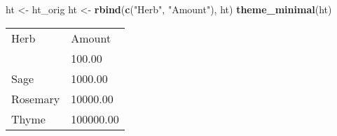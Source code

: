 \documentclass[]{article}
\newenvironment{Shaded}{\begin{snugshade}}{\end{snugshade}}
\newcommand{\KeywordTok}[1]{\textcolor[rgb]{0.13,0.29,0.53}{\textbf{{#1}}}}
\newcommand{\StringTok}[1]{\textcolor[rgb]{0.31,0.60,0.02}{{#1}}}
\newcommand{\NormalTok}[1]{{#1}}
\begin{document}
\begin{Shaded}
\begin{Highlighting}[]
\NormalTok{ht <-}\StringTok{ }\NormalTok{ht_orig}
\NormalTok{ht <-}\StringTok{ }\KeywordTok{rbind}\NormalTok{(}\KeywordTok{c}\NormalTok{(}\StringTok{"Herb"}\NormalTok{, }\StringTok{"Amount"}\NormalTok{), ht)}
\KeywordTok{theme_minimal}\NormalTok{(ht)}
\end{Highlighting}
\end{Shaded}

\begin{table}[h]
\begin{centering}\begin{tabularx}{0.5\textwidth}{p{} p{}}
\multicolumn{1}{l|}{\rule{0pt}{\baselineskip+4pt}\hspace*{4pt}Herb\hspace*{4pt}\rule[-4pt]{0pt}{4pt}} & \multicolumn{1}{l}{\rule{0pt}{\baselineskip+4pt}\hspace*{4pt}Amount\hspace*{4pt}\rule[-4pt]{0pt}{4pt}} \tabularnewline[-0.5pt]
\hhline{>{\arrayrulecolor{black}}->{\arrayrulecolor{black}}-}
\arrayrulecolor{black}
\multicolumn{1}{l|}{\rule{0pt}{\baselineskip+4pt}\hspace*{4pt}Parsley\hspace*{4pt}\rule[-4pt]{0pt}{4pt}} & \multicolumn{1}{l}{\rule{0pt}{\baselineskip+4pt}\hspace*{4pt}100.00\hspace*{4pt}\rule[-4pt]{0pt}{4pt}} \tabularnewline[-0.5pt]
\multicolumn{1}{l|}{\rule{0pt}{\baselineskip+4pt}\hspace*{4pt}Sage\hspace*{4pt}\rule[-4pt]{0pt}{4pt}} & \multicolumn{1}{l}{\rule{0pt}{\baselineskip+4pt}\hspace*{4pt}1000.00\hspace*{4pt}\rule[-4pt]{0pt}{4pt}} \tabularnewline[-0.5pt]
\multicolumn{1}{l|}{\rule{0pt}{\baselineskip+4pt}\hspace*{4pt}Rosemary\hspace*{4pt}\rule[-4pt]{0pt}{4pt}} & \multicolumn{1}{l}{\rule{0pt}{\baselineskip+4pt}\hspace*{4pt}10000.00\hspace*{4pt}\rule[-4pt]{0pt}{4pt}} \tabularnewline[-0.5pt]
\multicolumn{1}{l|}{\rule{0pt}{\baselineskip+4pt}\hspace*{4pt}Thyme\hspace*{4pt}\rule[-4pt]{0pt}{4pt}} & \multicolumn{1}{l}{\rule{0pt}{\baselineskip+4pt}\hspace*{4pt}100000.00\hspace*{4pt}\rule[-4pt]{0pt}{4pt}} \tabularnewline[-0.5pt]
\end{tabularx}
\par\end{centering}
\end{table}
\end{document}
